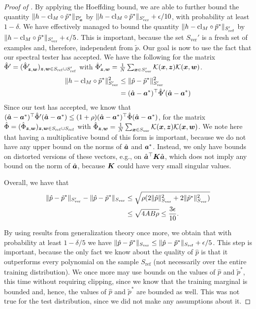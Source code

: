 \documentclass[11pt]{article} %
\numberwithin{equation}{section}
\begin{document}
\begin{proof}[Proof of ]
    By applying the Hoeffding bound, we are able to further bound the quantity $\| h - \mathrm{cl}_M\circ \tilde{p}^* \|_{{\mathcal{D}}_{{\bm{x}}}'}$ by $ \| h - \mathrm{cl}_M\circ \tilde{p}^* \|_{S_{\mathrm{ver}}'} + {\epsilon}/10$, with probability at least $1-\delta$. We have effectively managed to bound the quantity $\| h - \mathrm{cl}_M\circ \tilde{p}^* \|_{S_{\mathrm{ref}}'}$ by $\| h - \mathrm{cl}_M\circ \tilde{p}^* \|_{S_{\mathrm{ver}}'}+{\epsilon}/5$. This is important, because the set $S_{\mathrm{ver}}'$ is a fresh set of examples and, therefore, independent from $\tilde{p}$. Our goal is now to use the fact that our spectral tester has accepted. We have the following for the matrix $\hat\Phi' = (\hat\Phi'_{{\bm{z}},{\bm{w}}})_{{\bm{z}},{\bm{w}}\in S_{\mathrm{ref}}\cup S_{\mathrm{ref}}'}$ with $\hat\Phi'_{{\bm{z}},{\bm{w}}} = \frac{1}{N}\sum_{{\bm{x}}\in S_{\mathrm{ver}}'}\mathcal{K}({\bm{x}},{\bm{z}})\mathcal{K}({\bm{x}},{\bm{w}})$.
    \begin{align*}
        \| h - \mathrm{cl}_M\circ \tilde{p}^* \|_{S_{\mathrm{ver}}'}^2 
        &\le \| \hat p - \tilde{p}^* \|_{S_{\mathrm{ver}}'}^2 \\
        &= (\hat{{\bm{a}}} - {\bm{a}}^*)^\top \hat\Phi' (\hat{{\bm{a}}}-{\bm{a}}^*)
    \end{align*}
    Since our test has accepted, we know that $(\hat{{\bm{a}}} - {\bm{a}}^*)^\top \hat\Phi' (\hat{{\bm{a}}}-{\bm{a}}^*) \le (1+\rho)(\hat{{\bm{a}}} - {\bm{a}}^*)^\top \hat\Phi (\hat{{\bm{a}}}-{\bm{a}}^*)$, for the matrix $\hat\Phi = (\hat\Phi_{{\bm{z}},{\bm{w}}})_{{\bm{z}},{\bm{w}}\in S_{\mathrm{ref}}\cup S_{\mathrm{ref}}}$ with $\hat\Phi_{{\bm{z}},{\bm{w}}} = \frac{1}{N}\sum_{{\bm{x}}\in S_{\mathrm{ver}}}\mathcal{K}({\bm{x}},{\bm{z}})\mathcal{K}({\bm{x}},{\bm{w}})$. We note here that having a multiplicative bound of this form is important, because we do not have any upper bound on the norms of $\hat{{\bm{a}}}$ and ${\bm{a}}^*$. Instead, we only have bounds on distorted versions of these vectors, e.g., on $\hat{{\bm{a}}}^\top {\bm{K}} \hat{{\bm{a}}}$, which does not imply any bound on the norm of $\hat{{\bm{a}}}$, because ${\bm{K}}$ could have very small singular values.

    Overall, we have that 
    \begin{align*} \| \hat p - \tilde{p}^* \|_{S_{\mathrm{ver}}'} - \| \hat p - \tilde{p}^* \|_{S_{\mathrm{ver}}}
    &\le \sqrt{\rho (2\|\hat p\|_{S_{\mathrm{ver}}}^2+2\|\tilde{p}^*\|_{S_{\mathrm{ver}}}^2)} \\
    &\le \sqrt{4AB\rho}
    \le \frac{3{\epsilon}}{10}.
    \end{align*}

    By using results from generalization theory once more, we obtain that with probability at least $1-\delta/5$ we have $\| \hat p - \tilde{p}^* \|_{S_{\mathrm{ver}}} \le \| \hat p - \tilde{p}^* \|_{S_{\mathrm{ref}}}+{\epsilon}/5$. This step is important, because the only fact we know about the quality of $\hat{p}$ is that it outperforms every polynomial on the sample $S_{\mathrm{ref}}$ (not necessarily over the entire training distribution). We once more may use bounds on the values of $\hat p$ and $\tilde{p}^*$, this time without requiring clipping, since we know that the training marginal is bounded and, hence, the values of $\hat p$ and $\tilde{p}^*$ are bounded as well. This was not true for the test distribution, since we did not make any assumptions about it.


\end{proof}
\end{document}
